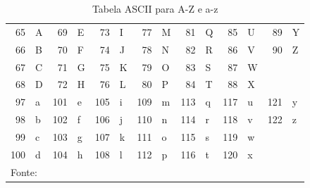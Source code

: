 \documentclass[12pt,a4paper]{article}
\numberwithin{figure}{subsection}
\numberwithin{table}{subsection}
\begin{document}
\begin{table}[H]
	\renewcommand{\arraystretch}{1}
	\centering
	\caption{Tabela ASCII para A-Z e a-z}
	\label{tab:ascii}
	\begin{tabular}{rl|rl|rl|rl|rl|rl|rl}
		\toprule
		 65 & A &  69 & E &  73 & I &  77 & M &  81 & Q &  85 & U &  89 & Y \\
		 66 & B &  70 & F &  74 & J &  78 & N &  82 & R &  86 & V &  90 & Z \\
		 67 & C &  71 & G &  75 & K &  79 & O &  83 & S &  87 & W &     &   \\
		 68 & D &  72 & H &  76 & L &  80 & P &  84 & T &  88 & X &     &   \\
		\midrule
		 97 & a & 101 & e & 105 & i & 109 & m & 113 & q & 117 & u & 121 & y \\
		 98 & b & 102 & f & 106 & j & 110 & n & 114 & r & 118 & v & 122 & z \\
		 99 & c & 103 & g & 107 & k & 111 & o & 115 & s & 119 & w &     &   \\
		100 & d & 104 & h & 108 & l & 112 & p & 116 & t & 120 & x &     &   \\
		\bottomrule
		\multicolumn{12}{l}{\footnotesize Fonte: \citet*{wiki:xxx}}
	\end{tabular}
\end{table}
\end{document}
